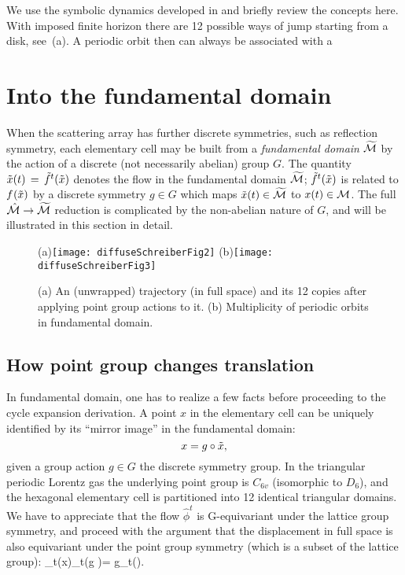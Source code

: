 \documentclass[aps,pre,
                showpacs,
                twocolumn,
                groupedaddress,
                floatfix]{revtex4-1}
\begin{document}
We use the symbolic dynamics developed in  and briefly
review the concepts here. With imposed finite horizon there are 12
possible ways of jump starting from a disk, see
\,(a). A periodic orbit then can always
be associated with a


\section{Into the fundamental domain}
\label{s-SymmetryReduction}

When the scattering array has further discrete symmetries, such as
reflection symmetry, each elementary cell may be built from a {\em
fundamental domain} ${\widetilde {{\cal M}}}$ by the action of a discrete (not
necessarily abelian) group $G$. The quantity $\tilde x(t)\,=\,{\tilde{f}^{t}(\tilde x)}$
denotes the flow in the fundamental domain ${\widetilde {{\cal M}}}$;
${\tilde{f}^{t}(\tilde x)}$ is related to ${f^{}(\tilde x)}$ by a discrete symmetry $g
\in G$ which maps $\tilde x(t)\in {\widetilde {\ensuremath{{\cal M}}}}$ to ${x}(t) \in {\ensuremath{{\cal M}}}$. The
full $\hat {{\cal M}} \rightarrow {\widetilde {\ensuremath{{\cal M}}}}$ reduction is complicated by the
non-abelian nature of $G$, and will be illustrated in this section in
detail.

\begin{figure}[htbp]
  \begin{center}
    (a)\texttt{[image: diffuseSchreiberFig2]}
    (b)\texttt{[image: diffuseSchreiberFig3]}
  \end{center}
  \caption[]{ \label{fig:schrieberFig23} (a) An (unwrapped) trajectory
    (in full space) and its 12 copies after applying point group
    actions to it. (b) Multiplicity of periodic orbits in fundamental
    domain.}
\end{figure}

\subsection{How point group changes translation}


In fundamental domain, one has to realize a few facts before
proceeding to the cycle expansion derivation. A point $x$ in the
elementary cell can be uniquely identified by its ``mirror image'' in
the fundamental domain:
\[
x=g\circ\tilde x,
\]
given a group action $g\in G$ the discrete symmetry group. In the
triangular periodic Lorentz gas the underlying point group is $C_{6v}$
(isomorphic to $D_6$), and the hexagonal elementary cell is
partitioned into 12 identical triangular domains. We have to
appreciate that the flow $\hat{\phi}^t$ is G-equivariant under the lattice
group symmetry, and proceed with the argument that the displacement in
full space is also equivariant under the point group symmetry (which
is a subset of the lattice group): \beq \hn_t(x)\equiv\hn_t(g\circ
\tx)= g\circ\hn_t(\tx).  \eeq
\end{document}
